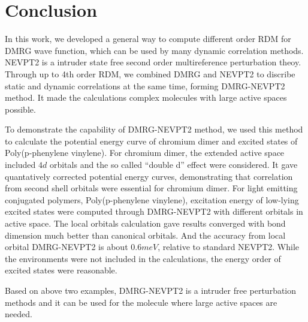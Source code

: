 
\section{Conclusion}

In this work, we developed a general way to compute different order RDM for DMRG wave function, which can be used by many dynamic correlation 
methods. NEVPT2 is a intruder state free second order multireference perturbation theoy. Through up to 4th order RDM, we combined DMRG and NEVPT2 
to discribe static and dynamic correlations at the same time, forming DMRG-NEVPT2 method. It made the calculations complex molecules with large active spaces possible. 

To demonstrate the capability of DMRG-NEVPT2 method, we used this method to calculate the potential energy curve of chromium dimer and excited 
states of Poly(p-phenylene vinylene). For chromium dimer, the extended active space included $4d$ orbitals and the so called ``double d'' effect 
were considered. It gave quantatively corrected potential energy curves, demonstrating that correlation from second shell orbitals were essential for chromium dimer.
For light emitting conjugated polymers, Poly(p-phenylene vinylene), excitation energy of low-lying excited states were computed through DMRG-NEVPT2 
with different orbitals in active space. The local orbitals calculation gave results converged with bond dimension much better than canonical 
orbitals. And the accuracy from local orbital DMRG-NEVPT2 is about $0.6meV$, relative to standard NEVPT2. While the environments were not included 
in the calculations, the energy order of excited states were reasonable.

Based on above two examples, DMRG-NEVPT2 is a intruder free perturbation methods and it can be used for the molecule where large active spaces are needed.